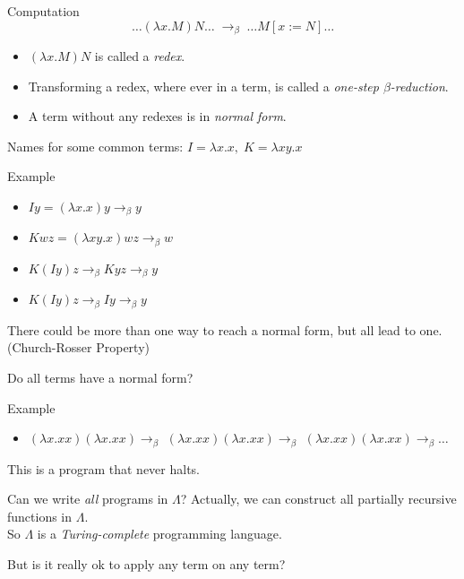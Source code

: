 \documentclass{beamer}
\begin{document}
\begin{frame}{\subLambda}
	\begin{block}{Computation}
		\[ \dots (\lambda x. M) N \dots \;\to_\beta\; \dots M [x := N] \dots \]
		\pause
		\begin{itemize}
			\item $(\lambda x. M) N$ is called a \emph{redex}.
			\pause
			\item Transforming a redex, where ever in a term, is called a \emph{one-step $\beta$-reduction}.
			\pause
			\item A term without any redexes is in \emph{normal form}.
		\end{itemize}
		\vspace{1ex}
	\end{block}
\end{frame}

\begin{frame}{\subLambda}
	Names for some common terms: \; $I = \lambda x. x, \; K = \lambda x y. x$
	\pause
	\begin{exampleblock}{Example}
		\begin{itemize}
			\item $I y = (\lambda x. x) y \to_\beta y$
			\pause
			\item $K w z = (\lambda x y. x) w z \to_\beta w$
			\pause
			\item $K (I y) z \to_\beta K y z \to_\beta y$
			\pause
			\item $K (I y) z \to_\beta I y \to_\beta y$
		\end{itemize}
	\end{exampleblock}
	\pause
	There could be more than one way to reach a normal form, but all lead to one. \pause (Church-Rosser Property)

\end{frame}

\begin{frame}[t]{\subLambda}
	Do all terms have a normal form?
	\pause
	\begin{exampleblock}{Example}
		\begin{itemize}
			\item $(\lambda x. x x)(\lambda x. x x) \to_\beta$ \pause $(\lambda x. x x)(\lambda x. x x) \to_\beta$ \pause $(\lambda x. x x)(\lambda x. x x) \to_\beta \dots$
		\end{itemize}
	\end{exampleblock}
	\pause
	This is a program that never halts.

	\pause
	\begin{block}{Can we write \emph{all} programs in $\Lambda$?}
		Actually, we can construct all partially recursive functions in $\Lambda$.\\ So $\Lambda$ is a \emph{Turing-complete} programming language.
	\end{block}
	
	\pause
	But is it really ok to apply any term on any term?
\end{frame}
\end{document}

